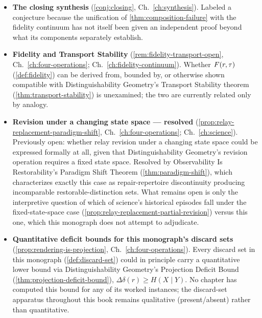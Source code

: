 \begin{itemize}
  \item \textbf{The closing synthesis} (\cref{conj:closing},
  Ch.~\ref{ch:synthesis}). Labeled a conjecture because the unification of
  \cref{thm:composition-failure} with the fidelity continuum has not
  itself been given an independent proof beyond what its components
  separately establish.

  \item \textbf{Fidelity and Transport Stability}
  (\cref{rem:fidelity-transport-open}, Ch.~\ref{ch:four-operations};
  Ch.~\ref{ch:fidelity-continuum}). Whether $F(r,\tau)$
  (\cref{def:fidelity}) can be derived from, bounded by, or otherwise shown
  compatible with Distinguishability Geometry's Transport Stability theorem
  (\cref{thm:transport-stability}) is unexamined; the two are currently
  related only by analogy.

  \item \textbf{Revision under a changing state space --- resolved}
  (\cref{prop:relay-replacement-paradigm-shift}, Ch.~\ref{ch:four-operations};
  Ch.~\ref{ch:science}). Previously open: whether relay revision under a
  changing state space could be expressed formally at all, given that
  Distinguishability Geometry's revision operation requires a fixed state
  space. Resolved by Observability Is Restorability's Paradigm Shift
  Theorem (\cref{thm:paradigm-shift}), which characterizes exactly this
  case as repair-repertoire discontinuity producing incomparable
  restorable-distinction sets. What remains open is only the
  interpretive question of which of science's historical episodes fall
  under the fixed-state-space case
  (\cref{prop:relay-replacement-partial-revision}) versus this one, which
  this monograph does not attempt to adjudicate.

  \item \textbf{Quantitative deficit bounds for this monograph's discard sets}
  (\cref{prop:rendering-is-projection}, Ch.~\ref{ch:four-operations}).
  Every discard set in this monograph (\cref{def:discard-set}) could in
  principle carry a quantitative lower bound via Distinguishability
  Geometry's Projection Deficit Bound (\cref{thm:projection-deficit-bound}),
  $\Delta\delta(r) \ge H(X \mid Y)$. No chapter has computed this bound for
  any of its worked instances; the discard-set apparatus throughout this
  book remains qualitative (present/absent) rather than quantitative.


\end{itemize}
